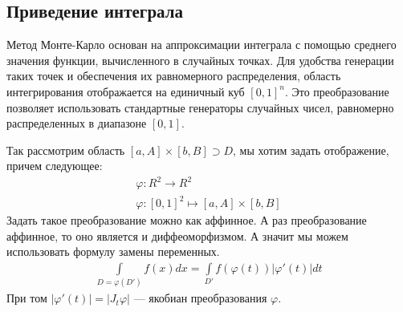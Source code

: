 \subsection{Приведение интеграла}
Метод Монте-Карло основан на аппроксимации интеграла с помощью среднего значения функции, вычисленного в случайных точках. Для удобства генерации таких точек и обеспечения их равномерного распределения, область интегрирования отображается на единичный куб \([0,1]^n\). Это преобразование позволяет использовать стандартные генераторы случайных чисел, равномерно распределенных в диапазоне \([0,1]\).

Так рассмотрим область \([a, A] \times [b, B] \supset D\), мы хотим задать отображение, причем следующее:
\begin{align}
	\varphi \colon R^2 \to R^2 \\
	\varphi \colon [0, 1]^2 \mapsto [a, A] \times [b, B]
\end{align}
Задать такое преобразование можно как аффинное. А раз преобразование аффинное, то оно является и диффеоморфизмом. А значит мы можем использовать формулу замены переменных.
\begin{align}
	\int\limits_{D=\varphi(D')}f(x)dx = \int\limits_{D'}f(\varphi(t))|\varphi'(t)|dt
\end{align}
При том \(|\varphi'(t)| = |J_t\varphi|\) --- якобиан преобразования \(\varphi\).

